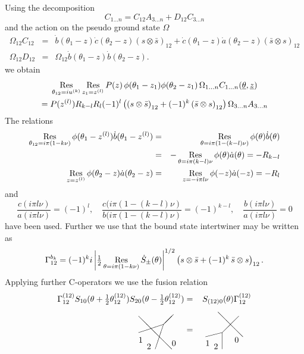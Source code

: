\documentclass[a4paper,a4paper]{article}
\def\proof{\noindent{\bfseries Proof. }}
\begin{document}
\proof%
Using the decomposition 
\[
C_{1\dots n}=C_{12}A_{3\dots n}+D_{12}C_{3\dots n} 
\]
and the action on the pseudo ground state $\Omega $ 
\begin{eqnarray*}
\Omega _{12}C_{12} &=&\dot{b}(\theta _{1}-z)\dot{c}(\theta _{2}-z)\left(
s\otimes \bar{s}\right) _{12}+\dot{c}(\theta _{1}-z)\dot{a}(\theta
_{2}-z)\left( \bar{s}\otimes s\right) _{12} \\
\Omega _{12}D_{12} &=&\Omega _{12}\dot{b}(\theta _{1}-z)\dot{b}(\theta
_{2}-z).
\end{eqnarray*}
we obtain 
\begin{multline*}
\mathop{\rm Res}_{\theta _{12}=iu^{(k)}}\mathop{\rm Res}_{z_{1}=z^{(l)}}P(z)%
\,\phi (\theta _{1}-z_{1})\phi (\theta _{2}-z_{1})\,\Omega _{1\dots
n}C_{1\dots n}(\underline{\theta },{\underline{z}}) \\
=P(z^{(l)})R_{k-l}R_{l}(-1)^{l}\left( \left( s\otimes \bar{s}\right)
_{12}+(-1)^{k}\left( \bar{s}\otimes s\right) _{12}\right) \Omega _{3\dots
n}A_{3\dots n}
\end{multline*}
The relations 
\begin{eqnarray*}
\mathop{\rm Res}_{\theta _{12}=i\pi (1-k\nu )}\phi (\theta _{1}-z^{(l)})\dot{%
b}(\theta _{1}-z^{(l)}) &=&\mathop{\rm Res}_{\theta =i\pi (1-(k-l)\nu )}\phi
(\theta )\dot{b}(\theta ) \\
&=&-\mathop{\rm Res}_{\theta =i\pi (k-l)\nu }\phi (\theta )\dot{a}(\theta
)=-R_{k-l} \\
\mathop{\rm Res}_{z=z^{(l)}}\phi (\theta _{2}-z)\dot{a}(\theta _{2}-z) &=&%
\mathop{\rm Res}_{z=-i\pi l\nu }\phi (-z)\dot{a}(-z)=-R_{l}
\end{eqnarray*}
and 
\[
\frac{c(i\pi l\nu )}{a(i\pi l\nu )}=(-1)^{l},\quad \frac{c(i\pi (1-(k-l)\nu )%
}{b(i\pi (1-(k-l)\nu )}=(-1)^{k-l},\quad \frac{b(i\pi l\nu )}{a(i\pi l\nu )}%
=0 
\]
have been used. Further we use that the bound state intertwiner may be
written as 
\[
\Gamma _{12}^{b_{k}}=(-1)^{k}i\left| \tfrac{1}{2}\mathop{\rm Res}_{\theta
=i\pi (1-k\nu )}\dot{S}_{\pm }(\theta )\right| ^{1/2}\left( s\otimes \bar{s}%
+(-1)^{k}\,\bar{s}\otimes s\right) _{12}. 
\]
Applying further C-operators we use the fusion relation 
\begin{eqnarray*}
\Gamma _{12}^{(12)}S_{10}(\theta +\tfrac{1}{2}\theta
_{12}^{(12)})S_{20}(\theta -\tfrac{1}{2}\theta _{12}^{(12)})
&=&S_{(12)0}(\theta )\Gamma _{12}^{(12)} \\
\begin{array}{c}
\unitlength3.5mm\begin{picture}(5,5) \put(3,3){\line(1,1){1.2}}
\put(4,0){\line(-1,1){4}} \put(0,2){\line(3,1){3}} \put(2,0){\line(1,3){1}}
\put(0,.8){1} \put(1,0){2} \put(4,.4){0} \end{picture}
\end{array}
&=& 
\begin{array}{c}
\unitlength3.5mm\begin{picture}(5,5) \put(2,2){\line(1,1){2}}
\put(4.5,1.5){\line(-1,1){3}} \put(2,2){\line(-4,-1){2}}
\put(2,0){\line(0,1){2}} \put(0,.4){1} \put(1,0){2} \put(3.5,.8){0}
\end{picture}
\end{array}
\end{eqnarray*}
\end{document}
